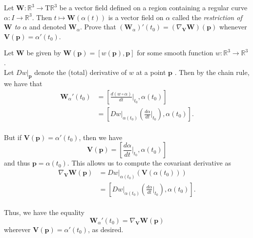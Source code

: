 \documentclass[12 pt, letterpaper]{hmcpset}
\begin{document}
\begin{problem}[Problem 1.]
	Let $\mathbf{W} : \mathbb{R}^{3} \to \mathrm{T}\mathbb{R}^{3}$ be a vector field defined on a region containing a regular curve $\alpha : I \to \mathbb{R}^{3}$. Then $t \mapsto \mathbf{W}(\alpha(t))$ is a vector field on $\alpha$ called the \textit{restriction of $\mathbf{W}$ to $\alpha$} and denoted $\mathbf{W}_{\alpha}$. Prove that $(\mathbf{W}_{\alpha})'(t_{0}) = (\nabla_{\mathbf{V}} \mathbf{W})(\mathbf{p})$ whenever $\mathbf{V}(\mathbf{p}) = \alpha'(t_{0})$.
\end{problem}

\begin{solution}
	Let  $\mathbf{W}$  be given by $\mathbf{W}(\mathbf{p}) = [w(\mathbf{p}), \mathbf{p}]$  for some smooth function $w : \mathbb{R}^{3} \to \mathbb{R}^{3}$ . \\

	Let $D w \Big |_{\mathbf{p}}$  denote the (total) derivative of $w$  at a point $\mathbf{p}$ . Then by the chain rule, we have that
	\[
		\begin{split}
			\mathbf{W}_{\alpha}'(t_{0}) & = \left [\frac{d (w \circ \alpha)}{d t} \Big |_{t_{0}}, \alpha(t_{0}) \right ] \\
						    & = \left [ D w \Big |_{\alpha(t_{0})} \left ( \frac{d \alpha}{d t} \Big |_{t_{0}} \right ), \alpha(t_{0}) \right ].
		\end{split}
	\] \\
	
	But if $\mathbf{V}(\mathbf{p}) = \alpha'(t_{0})$, then we have
	\[
		\mathbf{V}(\mathbf{p}) = \left [ \frac{d \alpha}{d t} \Big |_{t_{0}}, \alpha(t_{0}) \right ]
	\]
	and thus $\mathbf{p} = \alpha(t_{0})$. This allows us to compute the covariant derivative as
	\[
		\begin{split}
			\nabla_{\mathbf{V}} \mathbf{W}(\mathbf{p}) & = D w \Big |_{\alpha(t_{0})} (\mathbf{V}(\alpha(t_{0}))) \\
								   & = \left [ D w \Big |_{\alpha(t_{0})} \left ( \frac{d \alpha}{d t} \Big |_{t_{0}} \right ), \alpha(t_{0}) \right ].
		\end{split}
	\] \\

	Thus, we have the equality
	\[
		\mathbf{W}_{\alpha}'(t_{0}) = \nabla_{\mathbf{V}} \mathbf{W}(\mathbf{p})
	\]
	wherever $\mathbf{V}(\mathbf{p}) = \alpha'(t_{0})$, as desired.
\end{solution}

\pagebreak
\end{document}
